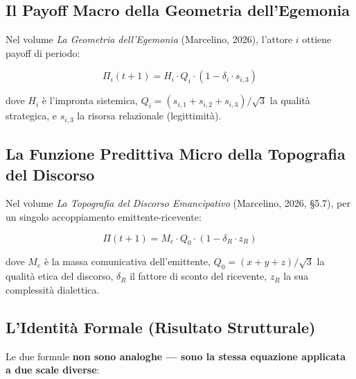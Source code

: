 \subsection{Il Payoff Macro della Geometria
dell'Egemonia}\label{il-payoff-macro-della-geometria-dellegemonia}

Nel volume \emph{La Geometria dell'Egemonia} (Marcelino, 2026), l'attore
\(i\) ottiene payoff di periodo:

\[
\Pi_i(t+1) = H_i \cdot Q_i \cdot (1 - \delta_i \cdot s_{i,3})
\]

dove \(H_i\) è l'impronta sistemica,
\(Q_i = (s_{i,1}+s_{i,2}+s_{i,3})/\sqrt{3}\) la qualità strategica, e
\(s_{i,3}\) la risorsa relazionale (legittimità).

\subsection{La Funzione Predittiva Micro della Topografia del
Discorso}\label{la-funzione-predittiva-micro-della-topografia-del-discorso}

Nel volume \emph{La Topografia del Discorso Emancipativo} (Marcelino,
2026, \S{}5.7), per un singolo accoppiamento emittente-ricevente:

\[
\Pi(t+1) = M_e \cdot Q_0 \cdot (1 - \delta_R \cdot z_R)
\]

dove \(M_e\) è la massa comunicativa dell'emittente,
\(Q_0 = (x+y+z)/\sqrt{3}\) la qualità etica del discorso, \(\delta_R\)
il fattore di sconto del ricevente, \(z_R\) la sua complessità
dialettica.

\subsection{\texorpdfstring{\Proved{} L'Identità Formale (Risultato
Strutturale)}{ L'Identità Formale (Risultato Strutturale)}}\label{lidentituxe0-formale-risultato-strutturale}

Le due formule \textbf{non sono analoghe --- sono la stessa equazione
applicata a due scale diverse}:

